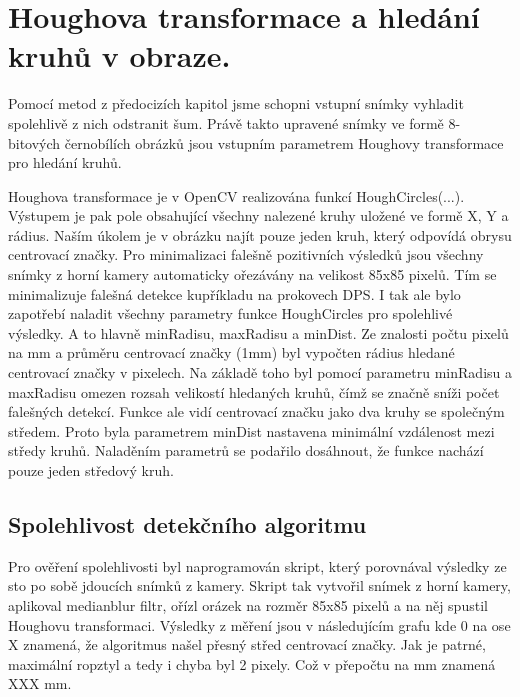 \section{Houghova transformace a  hledání kruhů v obraze.}

Pomocí metod z předocizích kapitol jsme schopni vstupní snímky vyhladit spolehlivě z nich odstranit šum. Právě takto upravené snímky ve formě 8-bitových černobílích obrázků jsou vstupním parametrem Houghovy transformace pro hledání kruhů.

Houghova transformace je v OpenCV realizována funkcí HoughCircles(...). Výstupem je pak pole obsahující všechny nalezené kruhy uložené ve formě X, Y a rádius. Naším úkolem je v obrázku najít pouze jeden kruh, který odpovídá obrysu centrovací značky. Pro minimalizaci falešně pozitivních výsledků jsou všechny snímky z horní kamery automaticky ořezávány na velikost 85x85 pixelů. Tím se minimalizuje falešná detekce kupříkladu na prokovech DPS. I tak ale bylo zapotřebí naladit všechny parametry funkce HoughCircles pro spolehlivé výsledky. A to hlavně minRadisu, maxRadisu a minDist. Ze znalosti počtu pixelů na mm a průměru centrovací značky (1mm) byl vypočten rádius hledané centrovací značky v pixelech. Na základě toho byl pomocí parametru minRadisu a maxRadisu omezen rozsah velikostí hledaných kruhů, čímž se značně sníži počet falešných detekcí. Funkce ale vidí centrovací značku jako dva kruhy se společným středem. Proto byla parametrem minDist nastavena minimální vzdálenost mezi středy kruhů. Naladěním parametrů se podařilo dosáhnout, že funkce nachází pouze jeden středový kruh.




\subsection{Spolehlivost detekčního algoritmu}
Pro ověření spolehlivosti byl naprogramován skript, který porovnával výsledky ze sto po sobě jdoucích snímků z kamery. Skript tak vytvořil snímek z horní kamery, aplikoval medianblur filtr, ořízl orázek na rozměr 85x85 pixelů a na něj spustil Houghovu transformaci. Výsledky z měření jsou v následujícím grafu kde 0 na ose X znamená, že algoritmus našel přesný střed centrovací značky. Jak je patrné, maximální ropztyl a tedy i chyba byl 2 pixely. Což v přepočtu na mm znamená XXX mm. 

